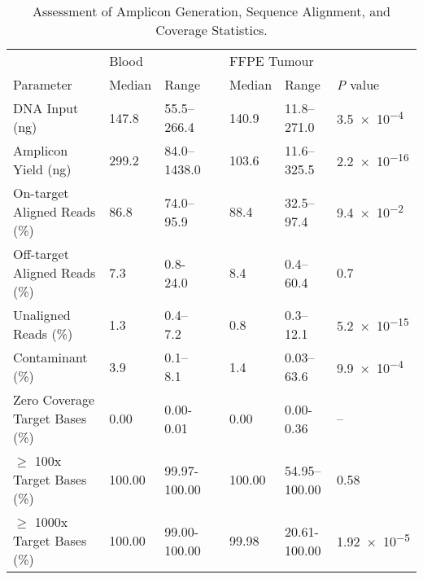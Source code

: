 \documentclass{bmcart}
\begin{document}
\begin{backmatter}
\begin{table}[H]
\caption{Assessment of Amplicon Generation, Sequence Alignment, and Coverage Statistics.}\label{metrics}
      \begin{tabular}{lllllll}
        \hline
				\multicolumn{1}{l}{ }
				&
				\multicolumn{2}{l}{Blood}
				&&
				\multicolumn{2}{l}{FFPE Tumour}
				&
				\multicolumn{1}{l}{ } \\
				\cline{2-3}\cline{5-6}
        Parameter & Median & Range && Median & Range & \textit{P} value \\ \hline
				DNA Input (ng) & 147.8 & 55.5--266.4 && 140.9 & 11.8--271.0 & \num{3.5e-4} \\
				Amplicon Yield (ng) & 299.2 & 84.0--1438.0 && 103.6 & 11.6--325.5 & \num{2.2e-16} \\
				\hline
				On-target Aligned Reads (\%) & 86.8 & 74.0--95.9 && 88.4 & 32.5--97.4 & \num{9.4e-2} \\
				Off-target Aligned Reads (\%) & 7.3 & 0.8-24.0 && 8.4 & 0.4--60.4 & \num{0.7} \\
				Unaligned Reads (\%) & 1.3 & 0.4--7.2 && 0.8 & 0.3--12.1 & \num{5.2e-15} \\
				Contaminant (\%) & 3.9 & 0.1--8.1 && 1.4 & 0.03--63.6 &
				\num{9.9e-4} \\
				\hline
				Zero Coverage Target Bases (\%) & 0.00 & 0.00-0.01 && 0.00 & 0.00-0.36 &
				-- \\
				$\geq$ 100x Target Bases (\%) & 100.00 & 99.97-100.00 && 100.00 & 54.95--100.00 &
				\num{0.58} \\
				$\geq$ 1000x Target Bases (\%) & 100.00 & 99.00-100.00 && 99.98 & 20.61-100.00 & \num{1.92e-5} \\
				\hline
      \end{tabular} \\
\end{table}


\end{backmatter}
\end{document}
